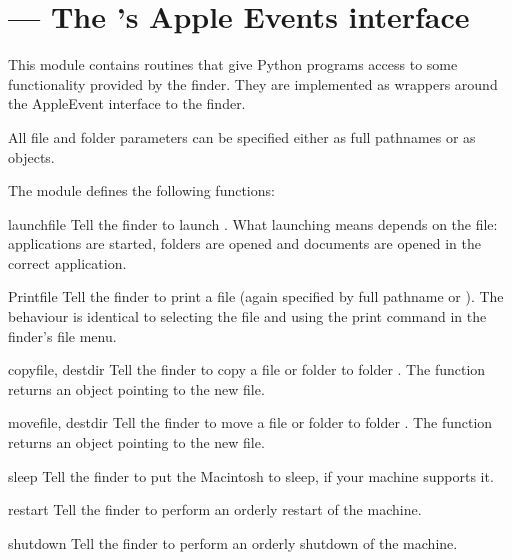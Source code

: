 \section{ ---
         The 's Apple Events interface}



This module contains routines that give Python programs access to some
functionality provided by the finder. They are implemented as wrappers
around the AppleEvent interface to the finder.

All file and folder parameters can be specified either as full
pathnames or as  objects.

The  module defines the following functions:


\begin{funcdesc}{launch}{file}
Tell the finder to launch . What launching means depends on the file:
applications are started, folders are opened and documents are opened
in the correct application.
\end{funcdesc}

\begin{funcdesc}{Print}{file}
Tell the finder to print a file (again specified by full pathname or
). The behaviour is identical to selecting the file and using
the print command in the finder's file menu.
\end{funcdesc}

\begin{funcdesc}{copy}{file, destdir}
Tell the finder to copy a file or folder  to folder
. The function returns an  object pointing to
the new file.
\end{funcdesc}

\begin{funcdesc}{move}{file, destdir}
Tell the finder to move a file or folder  to folder
. The function returns an  object pointing to
the new file.
\end{funcdesc}

\begin{funcdesc}{sleep}{}
Tell the finder to put the Macintosh to sleep, if your machine
supports it.
\end{funcdesc}

\begin{funcdesc}{restart}{}
Tell the finder to perform an orderly restart of the machine.
\end{funcdesc}

\begin{funcdesc}{shutdown}{}
Tell the finder to perform an orderly shutdown of the machine.
\end{funcdesc}
